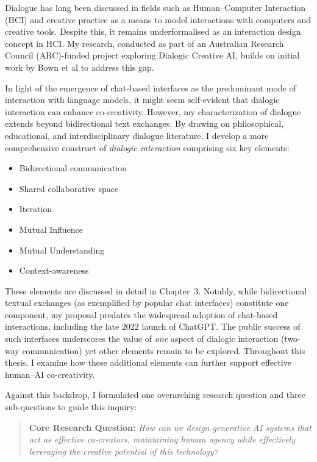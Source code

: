Dialogue has long been discussed in fields such as Human--Computer Interaction (HCI) and creative practice as a means to model interactions with computers and creative tools. Despite this, it remains underformalised as an interaction design concept in HCI. My research, conducted as part of an Australian Research Council (ARC)-funded project exploring Dialogic Creative AI, builds on initial work by Bown et al \cite{Bown2020-oc} to address this gap.

In light of the emergence of chat-based interfaces as the predominant mode of interaction with language models, it might seem self-evident that dialogic interaction can enhance co-creativity. However, my characterization of dialogue extends beyond bidirectional text exchanges. By drawing on philosophical, educational, and interdisciplinary dialogue literature, I develop a more comprehensive construct of \emph{dialogic interaction} comprising six key elements:

\begin{itemize}
    \item Bidirectional communication
    \item Shared collaborative space
    \item Iteration
    \item Mutual Influence
    \item Mutual Understanding
    \item Context-awareness
\end{itemize}

These elements are discussed in detail in Chapter~3. Notably, while bidirectional textual exchanges (as exemplified by popular chat interfaces) constitute one component, my proposal predates the widespread adoption of chat-based interactions, including the late 2022 launch of ChatGPT. The public success of such interfaces underscores the value of \emph{one} aspect of dialogic interaction (two-way communication) yet other elements remain to be explored. Throughout this thesis, I examine how these additional elements can further support effective human--AI co-creativity.

Against this backdrop, I formulated one overarching research question and three sub-questions to guide this inquiry:

\begin{quote}
\textbf{Core Research Question:}
\emph{How can we design generative AI systems that act as effective co-creators, maintaining human agency while effectively leveraging the creative potential of this technology?}
\end{quote}


